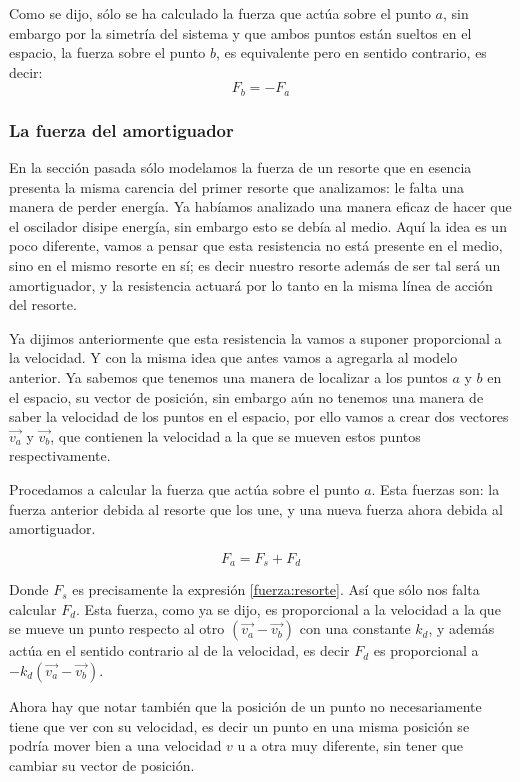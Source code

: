 Como se dijo, sólo se ha calculado la fuerza que actúa sobre el punto $a$, sin embargo por la simetría del sistema y que ambos puntos están sueltos en el espacio, la fuerza sobre el punto $b$, es equivalente pero en sentido contrario, es decir:
$$ F_b = - F_a $$

\subsubsection{La fuerza del amortiguador}

En la sección pasada sólo modelamos la fuerza de un resorte que en esencia presenta la misma carencia del primer resorte que analizamos: le falta una manera de perder energía. Ya habíamos analizado una manera eficaz de hacer que el oscilador disipe energía, sin embargo esto se debía al medio. Aquí la idea es un poco diferente, vamos a pensar que esta resistencia no está presente en el medio, sino en el mismo resorte en sí; es decir nuestro resorte además de ser tal será un amortiguador, y la resistencia actuará por lo tanto en la misma línea de acción del resorte.

Ya dijimos anteriormente que esta resistencia la vamos a suponer proporcional a la velocidad. Y con la misma idea que antes vamos a agregarla al modelo anterior. Ya sabemos que tenemos una manera de localizar a los puntos $a$ y $b$ en el espacio, su vector de posición, sin embargo aún no tenemos una manera de saber la velocidad de los puntos en el espacio, por ello vamos a crear dos vectores $\vec{v_a}$ y $\vec{v_b}$, que contienen la velocidad a la que se mueven estos puntos respectivamente.

Procedamos a calcular la fuerza que actúa sobre el punto $a$. Esta fuerzas son: la fuerza anterior debida al resorte que los une, y una nueva fuerza ahora debida al amortiguador.

\begin{equation}
F_a = F_s + F_d
\end{equation}

Donde $F_s$ es precisamente la expresión \ref{fuerza:resorte}. Así que sólo nos falta calcular $F_d$. Esta fuerza, como ya se dijo, es proporcional a la velocidad a la que se mueve un punto respecto al otro $\left( \vec{v_a} - \vec{v_b} \right)$ con una constante $k_d$, y además actúa en el sentido contrario al de la velocidad, es decir $F_d$ es proporcional a $-k_d \left( \vec{v_a} - \vec{v_b} \right)$.


Ahora hay que notar también que la posición de un punto no necesariamente tiene que ver con su velocidad, es decir un punto en una misma posición se podría mover bien a una velocidad $v$ u a otra muy diferente, sin tener que cambiar su vector de posición.

